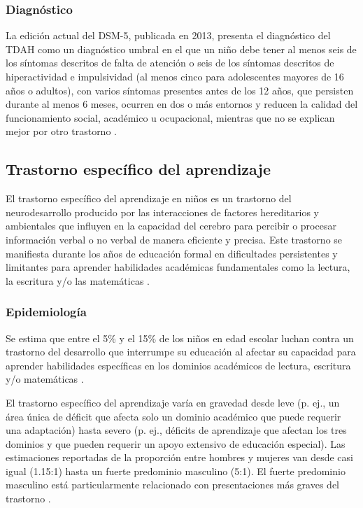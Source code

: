 \subsubsection{Diagnóstico}
La edición actual del DSM-5, publicada en 2013, presenta el diagnóstico del
TDAH como un diagnóstico umbral en el que un niño debe tener al menos seis de
los síntomas descritos de falta de atención o seis de los síntomas descritos
de hiperactividad e impulsividad (al menos cinco para adolescentes mayores de
16 años o adultos), con varios síntomas presentes antes de los 12 años, que
persisten durante al menos 6 meses, ocurren en dos o más entornos y reducen la
calidad del funcionamiento social, académico u ocupacional, mientras que no se
explican mejor por otro trastorno \cite{Lazar2025}.

\subsection{Trastorno específico del aprendizaje}
El trastorno específico del aprendizaje en niños es un trastorno del
neurodesarrollo producido por las interacciones de factores hereditarios y
ambientales que influyen en la capacidad del cerebro para percibir o procesar
información verbal o no verbal de manera eficiente y precisa. Este trastorno
se manifiesta durante los años de educación formal en dificultades
persistentes y limitantes para aprender habilidades académicas fundamentales
como la lectura, la escritura y/o las matemáticas \cite{Frierson2025}.

\subsubsection{Epidemiología}
Se estima que entre el 5\% y el 15\% de los niños en edad escolar luchan
contra un trastorno del desarrollo que interrumpe su educación al afectar su
capacidad para aprender habilidades específicas en los dominios académicos de
lectura, escritura y/o matemáticas \cite{Frierson2025}.

El trastorno específico del aprendizaje varía en gravedad desde leve (p. ej.,
un área única de déficit que afecta solo un dominio académico que puede
requerir una adaptación) hasta severo (p. ej., déficits de aprendizaje que
afectan los tres dominios y que pueden requerir un apoyo extensivo de
educación especial). Las estimaciones reportadas de la proporción entre
hombres y mujeres van desde casi igual (1.15:1) hasta un fuerte predominio
masculino (5:1). El fuerte predominio masculino está particularmente
relacionado con presentaciones más graves del trastorno \cite{Frierson2025}.

